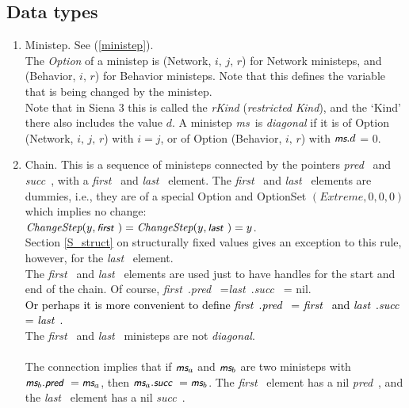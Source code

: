 \documentclass[a4paper,12pt,fleqn]{article}
\newcommand{\nnm}[1]{\textsf{\small\textit{#1}\ }}
\newcommand{\ms}{\textsl{\textsf{\small ms}}} %
\newcommand{\adda}[1]{{#1}}  %
\newcommand{\addaa}[1]{{\textcolor[named]{Black}{#1}}}  %
\begin{document}
\subsection{Data types}
\begin{enumerate}
\item  Ministep. See (\ref{ministep}).\\
       The \emph{\adda{Option}} of a ministep is (Network, $i,\, j,\, r$) for Network ministeps,
       and (Behavior, $i, \, r$) for Behavior ministeps.
       Note that this defines the variable that is being changed by the ministep.\\
       Note that in Siena 3 this is called the \emph{rKind} (\emph{restricted Kind}),
       and the `Kind' there also includes the value $d$.
       A ministep \ms \ is \emph{diagonal} if it is of \adda{Option} (Network, $i,\, j,\, r$)
       with $i = j$, or of \adda{Option} (Behavior, $i, \, r$) with $\ms.d$ = 0.
\item Chain. This is a sequence of ministeps connected by the pointers
      \nnm{pred} and \nnm{succ},
      with a \nnm{first} and \nnm{last} element.
      The \nnm{first} and \nnm{last} elements are dummies, i.e., they are of a special Option
      and OptionSet
      $(\textit{Extreme}, 0, 0, 0)$ which implies no change:\\
      $\textit{ChangeStep}(y,\nnm{first}) = \textit{ChangeStep}(y,\nnm{last}) = y$.\\
      Section \ref{S_struct} on structurally fixed values gives an exception to this rule,
      however, for the \nnm{last} element.\\
      The \nnm{first} and \nnm{last} elements are used just to have handles
      for the start and end of the chain.
      Of course, \nnm{first}.\nnm{pred} =\nnm{last}.\nnm{succ} = nil.\\
      \addaa{Or perhaps it is more convenient to define \nnm{first}.\nnm{pred} = \nnm{first}
      and \nnm{last}.\nnm{succ} = \nnm{last}.}\\
      The \nnm{first} and \nnm{last} ministeps are not \textit{diagonal}.\\
      \\
      The connection implies that if $\ms_a$ and $\ms_b$ are two ministeps
      with \\
      $\ms_b.\nnm{pred} = \ms_a$, then $\ms_a.\nnm{succ} = \ms_b$.
      The \nnm{first} element has a nil \nnm{pred}, and the \nnm{last} element
      has a nil \nnm{succ}.
\end{enumerate}
\end{document}
